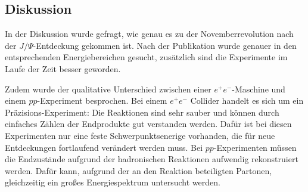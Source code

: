 \subsection{Diskussion}
In der Diskussion wurde gefragt, wie genau es zu der Novemberrevolution nach der $J/\Psi$-Entdeckung gekommen ist.
Nach der Publikation wurde genauer in den entsprechenden Energiebereichen gesucht, zusätzlich sind die Experimente im Laufe der Zeit besser geworden.

Zudem wurde der qualitative Unterschied zwischen einer $e^+ e^-$-Maschine und einem $pp$-Experiment besprochen.
Bei einem $e^+ e^-$ Collider handelt es sich um ein Präzisions-Experiment: Die Reaktionen sind sehr sauber und können durch einfaches Zählen der Endprodukte gut verstanden werden.
Dafür ist bei diesen Experimenten nur eine feste Schwerpunktsenerige vorhanden, die für neue Entdeckungen fortlaufend verändert werden muss.
Bei $pp$-Experimenten müssen die Endzustände aufgrund der hadronischen Reaktionen aufwendig rekonstruiert werden.
Dafür kann, aufgrund der an den Reaktion beteiligten Partonen, gleichzeitig ein großes Energiespektrum untersucht werden.